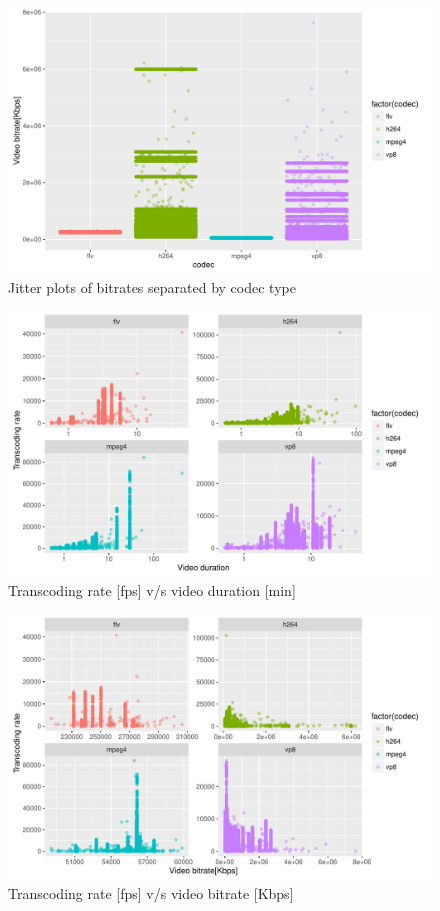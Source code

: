 \documentclass[letterpaper,12pt,titlepage,oneside,final]{report}
\begin{document}
        \begin{figure}[!h]
            \centering
            \includegraphics[width=\textwidth]{bitrate_hist}
            \caption{Jitter plots of bitrates separated by codec type}
            \label{bitrate_hist}
        \end{figure}
        \begin{figure}[!h]
            \centering
            \includegraphics[width=\textwidth]{dur_vs_trate}
            \caption{Transcoding rate [fps] v/s video duration [min]}
            \label{dur_vs_trate}
        \end{figure}
        \begin{figure}[!h]
            \centering
            \includegraphics[width=\textwidth]{bitrate_vs_trate}
            \caption{Transcoding rate [fps] v/s video bitrate [Kbps]}
            \label{bitrate_vs_trate}
        \end{figure}
\end{document}
